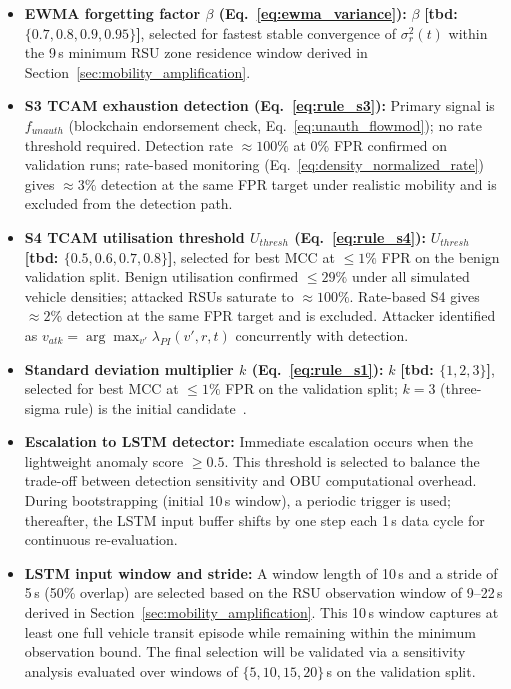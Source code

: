 \documentclass[12pt, a4paper]{report}
\begin{document}
{{\begin{itemize}
    \item \textbf{EWMA forgetting factor $\beta$
    (Eq.~\ref{eq:ewma_variance}):}
    $\beta$ \textbf{[tbd: $\{0.7, 0.8, 0.9,
    0.95\}$]}, selected for fastest stable
    convergence of $\sigma_r^2(t)$ within the
    9\,s minimum RSU zone residence window derived
    in Section~\ref{sec:mobility_amplification}.
    \item \textbf{S3 \ac{TCAM} exhaustion detection
    (Eq.~\ref{eq:rule_s3}):}
    Primary signal is $f_{unauth}$ (blockchain endorsement
    check, Eq.~\ref{eq:unauth_flowmod}); no rate threshold
    required. Detection rate $\approx 100\%$ at $0\%$
    \ac{FPR} confirmed on validation runs; rate-based
    monitoring (Eq.~\ref{eq:density_normalized_rate})
    gives $\approx 3\%$ detection at the same \ac{FPR}
    target under realistic mobility and is excluded from
    the detection path.
    
    \item \textbf{S4 \ac{TCAM} utilisation threshold
    $U_{thresh}$ (Eq.~\ref{eq:rule_s4}):}
    $U_{thresh}$ \textbf{[tbd: $\{0.5, 0.6, 0.7,
    0.8\}$]}, selected for best \ac{MCC} at $\leq 1\%$
    \ac{FPR} on the benign validation split. Benign
    utilisation confirmed $\leq 29\%$ under all simulated
    vehicle densities; attacked \ac{RSU}s saturate to
    $\approx 100\%$. Rate-based S4 gives $\approx 2\%$
    detection at the same \ac{FPR} target and is excluded.
    Attacker identified as $v_{atk} = \arg\max_{v'}
    \lambda_{PI}(v',r,t)$ concurrently with detection.
    

    \item \textbf{Standard deviation multiplier
    $k$ (Eq.~\ref{eq:rule_s1}):}
    $k$ \textbf{[tbd: $\{1, 2, 3\}$]}, selected
    for best MCC at $\leq 1\%$ FPR on the
    validation split; $k{=}3$ (three-sigma rule)
    is the initial candidate~\cite{pukelsheim1994three}.

    \item \textbf{Escalation to LSTM detector:} Immediate escalation occurs when the lightweight anomaly score $\geq 0.5$. This threshold is selected to balance the trade-off between detection sensitivity and OBU computational overhead. During bootstrapping (initial 10\,s window), a periodic trigger is used; thereafter, the LSTM input buffer shifts by one step each 1\,s data cycle for continuous re-evaluation.
    \item \textbf{LSTM input window and stride:} A window length of 10\,s and a stride of 5\,s (50\% overlap) are selected based on the RSU observation window of 9--22\,s derived in Section~\ref{sec:mobility_amplification}. This 10\,s window captures at least one full vehicle transit episode while remaining within the minimum observation bound. The final selection will be validated via a sensitivity analysis evaluated over windows of $\{5, 10, 15, 20\}$\,s on the validation split.


\end{itemize}}}
\end{document}
